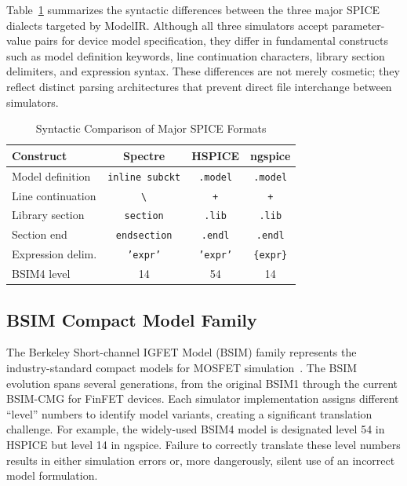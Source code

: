 \documentclass[conference]{IEEEtran}
\begin{document}
Table~\ref{tab:simulators} summarizes the syntactic differences between the three major SPICE dialects targeted by ModelIR. Although all three simulators accept parameter-value pairs for device model specification, they differ in fundamental constructs such as model definition keywords, line continuation characters, library section delimiters, and expression syntax. These differences are not merely cosmetic; they reflect distinct parsing architectures that prevent direct file interchange between simulators.

\begin{table}[!t]
\caption{Syntactic Comparison of Major SPICE Formats}
\label{tab:simulators}
\centering
\renewcommand{\arraystretch}{1.15}
\begin{tabular}{@{}lccc@{}}
\toprule
\textbf{Construct} & \textbf{Spectre} & \textbf{HSPICE} & \textbf{ngspice} \\
\midrule
Model definition & \texttt{inline subckt} & \texttt{.model} & \texttt{.model} \\
Line continuation & \texttt{\textbackslash} & \texttt{+} & \texttt{+} \\
Library section & \texttt{section} & \texttt{.lib} & \texttt{.lib} \\
Section end & \texttt{endsection} & \texttt{.endl} & \texttt{.endl} \\
Expression delim. & \texttt{'expr'} & \texttt{'expr'} & \texttt{\{expr\}} \\
BSIM4 level & 14 & 54 & 14 \\
\bottomrule
\end{tabular}
\end{table}

\subsection{BSIM Compact Model Family}

The Berkeley Short-channel IGFET Model (BSIM) family represents the industry-standard compact models for MOSFET simulation~\cite{bsim4, bsim_history}. The BSIM evolution spans several generations, from the original BSIM1 through the current BSIM-CMG for FinFET devices. Each simulator implementation assigns different ``level'' numbers to identify model variants, creating a significant translation challenge. For example, the widely-used BSIM4 model is designated level 54 in HSPICE but level 14 in ngspice. Failure to correctly translate these level numbers results in either simulation errors or, more dangerously, silent use of an incorrect model formulation.
\end{document}
